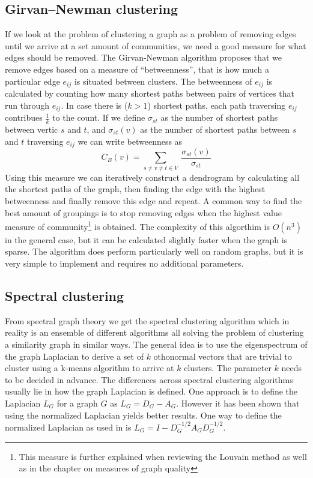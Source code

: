 \subsection{Girvan–Newman clustering}
If we look at the problem of clustering a graph as a problem of removing 
edges until we arrive at a set amount of communities, we need a good 
measure for what edges should be removed. The Girvan-Newman algorithm 
proposes that we remove edges based on a measure of ``betweenness'', 
that is how much a particular edge $e_{ij}$ is situated between 
clusters. The betweenness of $e_{ij}$ is calculated by counting how many 
shortest paths between pairs of vertices that run through $e_{ij}$. In 
case there is ($k > 1$) shortest paths, each path traversing $e_{ij}$ 
contribues $\frac{1}{k}$ to the count.  If we define $\sigma_{st}$ as 
the number of shortest paths between vertic $s$ and $t$, and 
$\sigma_{st}(v)$ as the number of shortest paths between $s$ and $t$ 
traversing $e_{ij}$ we can write betweenness as
\begin{equation}
	C_B(v)= \sum_{s \neq v \neq t \in V} \
	\frac{\sigma_{st}(v)}{\sigma_{st}}
\end{equation}
Using this measure we can iteratively construct a dendrogram by 
calculating all the shortest paths of the graph, then finding the edge 
with the highest betweenness and finally remove this edge and repeat. A 
common way to find the best amount of groupings is to stop removing 
edges when the highest value measure of community\footnote{This measure 
	is further explained when reviewing the Louvain method as well as in 
the chapter on measures of graph quality} is obtained.
The complexity of this algorthim is $O(n^3)$ in the general case, but it
can be calculated slightly faster when the graph is sparse. The 
algorithm does perform particularly well on random graphs, but it is 
very simple to implement and requires no additional parameters.



\subsection{Spectral clustering}
From spectral graph theory we get the spectral clustering algorithm 
which in reality is an ensemble of different algorithms all solving the 
problem of clustering a similarity graph in similar ways. The general 
idea is to use the eigenspectrum of the graph Laplacian to derive a set 
of $k$ othonormal vectors that are trivial to cluster using a k-means 
algorithm to arrive at $k$ clusters\cite{von2007}. The parameter $k$ 
needs to be decided in advance. The differences across spectral 
clustering algorithms usually lie in how the graph Laplacian is defined.  
One approach is to define the Laplacian $L_G$ for a graph $G$ as $L_G = 
D_G - A_G$. However it has been shown that using the normalized 
Laplacian yields better results.  One way to define the normalized 
Laplacian as used in \cite{ng2002} is $L_G = I - D_{G}^{-1/2} A_G 
D_{G}^{-1/2}$.

